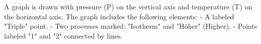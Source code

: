 A graph is drawn with pressure (P) on the vertical axis and temperature (T) on the horizontal axis. The graph includes the following elements:  
- A labeled "Triple" point.  
- Two processes marked: "Isotherm" and "Höher" (Higher).  
- Points labeled "1" and "2" connected by lines.